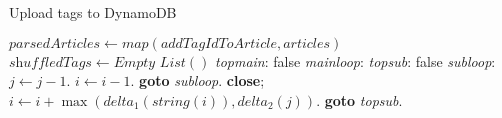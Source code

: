 \begin{algorithm}

\caption{Upload tags to DynamoDB}\label{euclid}

\begin{algorithmic}[1]
\State $\textit{parsedArticles} \gets \textit{map}(\textit{addTagIdToArticle}, \textit{articles})$
\State $\textit{shuffledTags} \gets \textit{Empty List}()$
\BState \emph{topmain}:
 \Return false
\EndIf
\BState \emph{mainloop}:
\BState \emph{topsub}:
 \Return false
\EndIf
\BState \emph{subloop}:
\State $j \gets j-1$.
\State $i \gets i-1$.
\State \textbf{goto} \emph{subloop}.
\State \textbf{close};
\EndIf
\State $i \gets i+\max(\textit{delta}_1(\textit{string}(i)),\textit{delta}_2(j))$.
\State \textbf{goto} \emph{topsub}.
\EndProcedure

\end{algorithmic}

\end{algorithm}
